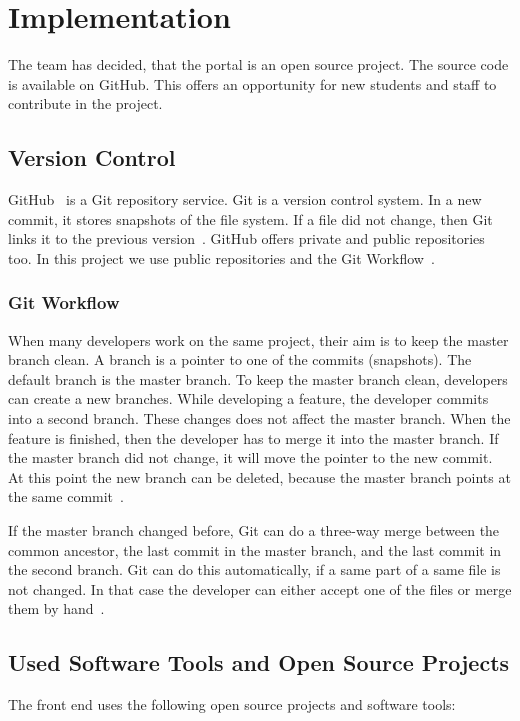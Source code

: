 \chapter{Implementation}

The team has decided, that the portal is an open source project. The source code is available on GitHub. This offers an opportunity for new students and staff to contribute in the project.


\section{Version Control}
GitHub~\cite{github} is a Git repository service. Git is a version control system. In a new commit, it stores snapshots of the file system. If a file did not change, then Git links it to the previous version~\cite{git}. GitHub offers private and public repositories too. In this project we use public repositories and the Git Workflow~\cite{git-workflow}. 

\subsection{Git Workflow}
When many developers work on the same project, their aim is to keep the master branch clean. A branch is a pointer to one of the commits (snapshots). The default branch is the master branch. To keep the master branch clean, developers can create a new branches. While developing a feature, the developer commits into a second branch. These changes does not affect the master branch. When the feature is finished, then the developer has to merge it into the master branch. If the master branch did not change, it will move the pointer to the new commit. At this point the new branch can be deleted, because the master branch points at the same commit~\cite{git-workflow2}.

If the master branch changed before, Git can do a three-way merge between the common ancestor, the last commit in the master branch, and the last commit in the second branch. Git can do this automatically, if a same part of a same file is not changed. In that case the developer can either accept one of the files or merge them by hand~\cite{git-workflow2}.

\section{Used Software Tools and Open Source Projects}
The front end uses the following open source projects and software tools:

